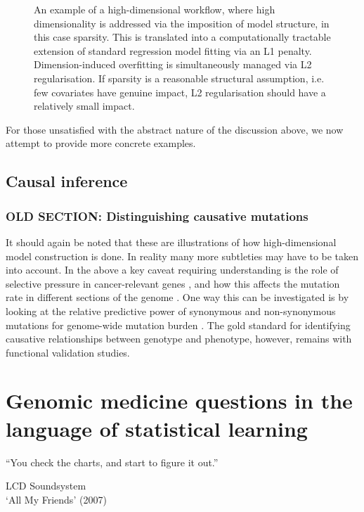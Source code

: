 \documentclass[thesis.tex]{subfiles}
\begin{document}
\begin{figure}[htbp]
\centering
{}
\caption{An example of a high-dimensional workflow, where high dimensionality is addressed via the imposition of model structure, in this case sparsity. This is translated into a computationally tractable extension of standard regression model fitting via an L1 penalty. Dimension-induced overfitting is simultaneously managed via L2 regularisation. If sparsity is a reasonable structural assumption, i.e. few covariates have genuine impact, L2 regularisation should have a relatively small impact.\label{fig:workflow}}
\end{figure}

For those unsatisfied with the abstract nature of the discussion above, we now attempt to provide more concrete examples.

\subsection{Causal inference}
{\color{red}\subsubsection{OLD SECTION: Distinguishing causative mutations}
It should again be noted that these are illustrations of how high-dimensional model construction is done. In reality many more subtleties may have to be taken into account. In the above a key caveat requiring understanding is the role of selective pressure in cancer-relevant genes \citep{bull_unlocking_2013}, and how this affects the mutation rate in different sections of the genome \citep{iengar_identifying_2018}. One way this can be investigated is by looking at the relative predictive power of synonymous and non-synonymous mutations for genome-wide mutation burden \citep{chu_nonsynonymous_2019}. The gold standard for identifying causative relationships between genotype and phenotype, however, remains with functional validation studies.
}

\section{Genomic medicine questions in the language of statistical learning} \label{sec:questions}
\epigraph{``You check the charts, and start to figure it out.''}{LCD Soundsystem \\`All My Friends' (2007)}
\end{document}
